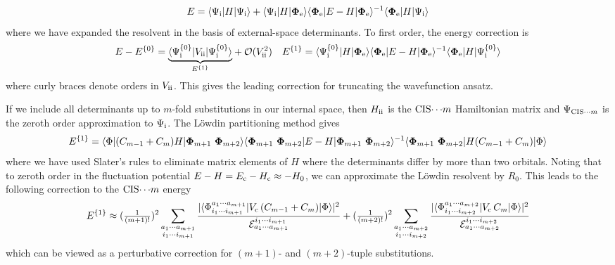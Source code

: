 \documentclass[11pt]{article}
\numberwithin{equation}{section}
\begin{document}
\begin{rmk}
\begin{align}
  E
=
  \langle\Psi _{\mathrm{i}}|H|\Psi _{\mathrm{i}}\rangle
+
  \langle\Psi _{\mathrm{i}}|H|\mathbf{\Phi }_{\mathrm{e}}\rangle
  \langle\mathbf{\Phi }_{\mathrm{e}}|E - H|\mathbf{\Phi }_{\mathrm{e}}\rangle^{-1}
  \langle\mathbf{\Phi }_{\mathrm{e}}|H|\Psi _{\mathrm{i}}\rangle
\end{align}
where we have expanded the resolvent in the basis of external-space determinants.
To first order, the energy correction is
\begin{align}
  E
-
  E^{\{0\}}
=
\underset{E^{\{1\}}}{\underbrace{
  \langle\Psi _{\mathrm{i}}^{\{0\}}|V_{\mathrm{ii}}|\Psi _{\mathrm{i}}^{\{0\}}\rangle
}}
+
  \mathcal{O}(V_{\mathrm{ii}}^2)
&&
  E^{\{1\}}
=
  \langle\Psi _{\mathrm{i}}^{\{0\}}|H|\mathbf{\Phi }_{\mathrm{e}}\rangle
  \langle\mathbf{\Phi }_{\mathrm{e}}|E - H|\mathbf{\Phi }_{\mathrm{e}}\rangle^{-1}
  \langle\mathbf{\Phi }_{\mathrm{e}}|H|\Psi _{\mathrm{i}}^{\{0\}}\rangle
\end{align}
where curly braces denote orders in $V_{\mathrm{ii}}$.
This gives the leading correction for truncating the wavefunction ansatz.
\end{rmk}

\begin{ex}
If we include all determinants up to $m$-fold substitutions in our internal space, then $H_{\mathrm{ii}}$ is the $\mathrm{CIS}{\cdots}m$ Hamiltonian matrix and $\Psi _{\mathrm{CIS}{\cdots}m}$ is the zeroth order approximation to $\Psi _{\mathrm{i}}$.
The L\"owdin partitioning method gives
\begin{align}
  E^{\{1\}}
=
  \ip{\F|(C_{m-1} + C_m)H|\bo{\F}_{m+1}\ \bo{\F}_{m+2}}
  \ip{\bo{\F}_{m+1}\ \bo{\F}_{m+2}|E - H|\bo{\F}_{m+1}\ \bo{\F}_{m+2}}^{-1}
  \ip{\bo{\F}_{m+1}\ \bo{\F}_{m+2}|H(C_{m-1} + C_m)|\F}
\end{align}
where we have used Slater's rules to eliminate matrix elements of $H$ where the determinants differ by more than two orbitals.
Noting that to zeroth order in the fluctuation potential
$
  E
-
  H
=
  E_{\mathrm{c}}
-
  H_{\mathrm{c}}
\approx
-
  H_0
$, we can approximate the L\"owdin resolvent by $R_0$.
This leads to the following correction to the $\mathrm{CIS}{\cdots}m$ energy
\begin{align}
  E^{\{1\}}
\approx
  (\tfrac{1}{(m+1)!})^2
  \sum_{\substack{a_1\cdots a_{m+1}\\i_1\cdots i_{m+1}}}
  \frac {
    |\langle\Phi _{i_1\cdots i_{m+1}}^{a_1\cdots a_{m+1}}|V_{\mathrm{c}}\,(C_{m-1} + C_m)|\Phi \rangle|^2
  }{
    \mathcal{E}_{a_1\cdots a_{m+1}}^{i_1\cdots i_{m+1}}
  }
+
  (\tfrac{1}{(m+2)!})^2
  \sum_{\substack{a_1\cdots a_{m+2}\\i_1\cdots i_{m+2}}}
  \frac {
    |\langle\Phi _{i_1\cdots i_{m+2}}^{a_1\cdots a_{m+2}}|V_{\mathrm{c}}\,C_m|\Phi \rangle|^2
  }{
    \mathcal{E}_{a_1\cdots a_{m+2}}^{i_1\cdots i_{m+2}}
  }
\end{align}
which can be viewed as a perturbative correction for $(m+1)$- and $(m+2)$-tuple substitutions.
\end{ex}
\end{document}
